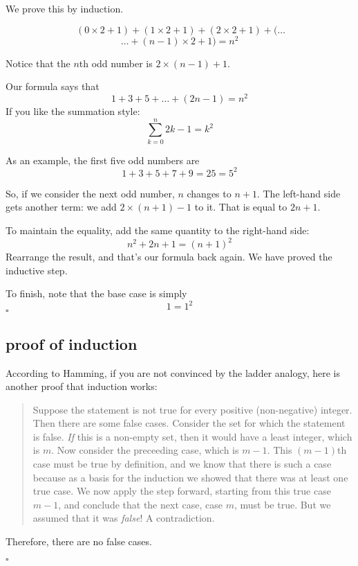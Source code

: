 \documentclass[11pt, oneside]{article}
\begin{document}
We prove this by induction.

\[ \ (0 \times 2 + 1) +  (1 \times 2 + 1) + (2 \times 2 + 1) + (\dots \]
\[ \dots + (n-1) \times 2 + 1) = n^2 \]

Notice that the $n$th odd number is $2 \times (n-1) + 1$.

Our formula says that
\[ 1 + 3 + 5 + \dots + (2n - 1) = n^2 \]
If you like the summation style:
\[ \sum_{k=0}^n 2k - 1 = k^2 \]

As an example, the first five odd numbers are
\[ 1 + 3 + 5 + 7 + 9 = 25 = 5^2 \]

So, if we consider the next odd number, $n$ changes to $n+1$.  The left-hand side gets another term:  we add $2 \times (n+1)-1$ to it.  That is equal to $2n + 1$.

To maintain the equality, add the same quantity to the right-hand side:
\[ n^2 + 2n + 1 = (n+1)^2 \]
Rearrange the result, and that's our formula back again.  We have proved the inductive step.  

To finish, note that the base case is simply
\[ 1 = 1^2 \]
$\square$

\subsection*{proof of induction}

According to Hamming, if you are not convinced by the ladder analogy, here is another proof that induction works:

\begin{quote}Suppose the statement is not true for every positive (non-negative) integer.  Then there are some false cases.  Consider the set for which the statement is false.  \emph{If} this is a non-empty set, then it would have a least integer, which is $m$.  Now consider the preceeding case, which is $m - 1$.  This $(m-1)$th case must be true by definition, and we know that there is such a case because as a basis for the induction we showed that there was at least one true case.  We now apply the step forward, starting from this true case $m-1$, and conclude that the next case, case $m$, must be true.  But we assumed that it was \emph{false}!  A contradiction. \end{quote}

Therefore, there are no false cases.

$\square$
\end{document}
